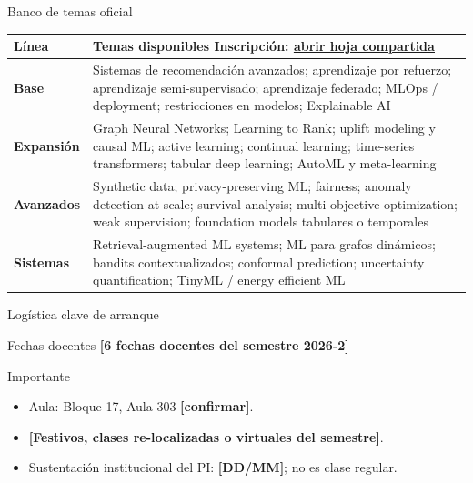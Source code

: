 \documentclass[aspectratio=169,12pt]{beamer}
\newcommand{\hrow}{\rowcolor{mlcream}}
\newcommand{\pend}[1]{\textcolor{mlred}{\textbf{[#1]}}}
\begin{document}
\begin{frame}{Banco de temas oficial}
  \centering\footnotesize
  \begin{tabular}{@{}l L{0.78\textwidth}@{}}
    \toprule
    \hrow \textbf{Línea} & Temas disponibles \hfill \textbf{Inscripción:} \href{https://eafit-my.sharepoint.com/:x:/g/personal/avasquezr3_eafit_edu_co/IQBMNr9rRCRzSIhl0wmT5yroAXJ4WnD7ZvdjMnQujZHcw5Y?e=CsqvSX}{\textcolor{eafitneon}{\underline{abrir hoja compartida}}} \\
    \midrule
    \textbf{Base} & Sistemas de recomendación avanzados; aprendizaje por refuerzo; aprendizaje semi-supervisado; aprendizaje federado; MLOps / deployment; restricciones en modelos; Explainable AI \\
    \midrule
    \textbf{Expansión} & Graph Neural Networks; Learning to Rank; uplift modeling y causal ML; active learning; continual learning; time-series transformers; tabular deep learning; AutoML y meta-learning \\
    \midrule
    \textbf{Avanzados} & Synthetic data; privacy-preserving ML; fairness; anomaly detection at scale; survival analysis; multi-objective optimization; weak supervision; foundation models tabulares o temporales \\
    \midrule
    \textbf{Sistemas} & Retrieval-augmented ML systems; ML para grafos dinámicos; bandits contextualizados; conformal prediction; uncertainty quantification; TinyML / energy efficient ML \\
    \bottomrule
  \end{tabular}
\end{frame}

\begin{frame}{Logística clave de arranque}
  \begin{block}{{\large Fechas docentes}}
    \pend{6 fechas docentes del semestre 2026-2}
  \end{block}
  \begin{alertblock}{{\large Importante}}
    \begin{itemize}
      \item Aula: Bloque 17, Aula 303 \pend{confirmar}.
      \item \pend{Festivos, clases re-localizadas o virtuales del semestre}.
      \item Sustentación institucional del PI: \pend{DD/MM}; no es clase regular.
    \end{itemize}
  \end{alertblock}
\end{frame}
\end{document}
